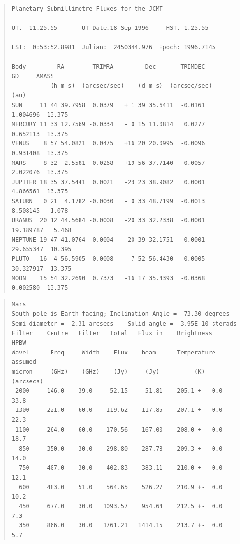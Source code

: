 \documentclass[11pt,twoside]{article}
\newenvironment{myquote}{\begin{quote}\begin{small}}{\end{small}\end{quote}}
\renewcommand{\_}{\texttt{\symbol{95}}}
\begin{document}
\begin{myquote}
\begin{verbatim}
Planetary Submillimetre Fluxes for the JCMT

UT:  11:25:55       UT Date:18-Sep-1996     HST: 1:25:55

LST:  0:53:52.8981  Julian:  2450344.976  Epoch: 1996.7145

Body         RA        TRIMRA         Dec       TRIMDEC        GD     AMASS
           (h m s)  (arcsec/sec)    (d m s)  (arcsec/sec)     (au)
SUN     11 44 39.7958  0.0379   + 1 39 35.6411  -0.0161    1.004696  13.375
MERCURY 11 33 12.7569 -0.0334   - 0 15 11.0814   0.0277    0.652113  13.375
VENUS    8 57 54.0821  0.0475   +16 20 20.0995  -0.0096    0.931408  13.375
MARS     8 32  2.5581  0.0268   +19 56 37.7140  -0.0057    2.022076  13.375
JUPITER 18 35 37.5441  0.0021   -23 23 38.9082   0.0001    4.866561  13.375
SATURN   0 21  4.1782 -0.0030   - 0 33 48.7199  -0.0013    8.508145   1.078
URANUS  20 12 44.5684 -0.0008   -20 33 32.2338  -0.0001   19.189787   5.468
NEPTUNE 19 47 41.0764 -0.0004   -20 39 32.1751  -0.0001   29.655347  10.395
PLUTO   16  4 56.5905  0.0008   - 7 52 56.4430  -0.0005   30.327917  13.375
MOON    15 54 32.2690  0.7373   -16 17 35.4393  -0.0368    0.002580  13.375
\end{verbatim}
\end{myquote}

\newpage

\begin{myquote}
\begin{verbatim}
Mars
South pole is Earth-facing; Inclination Angle =  73.30 degrees
Semi-diameter =  2.31 arcsecs    Solid angle =  3.95E-10 sterads
Filter    Centre   Filter   Total   Flux in    Brightness          HPBW
Wavel.     Freq     Width    Flux    beam      Temperature       assumed
micron     (GHz)    (GHz)    (Jy)     (Jy)          (K)          (arcsecs)
 2000     146.0    39.0     52.15     51.81    205.1 +-  0.0       33.8
 1300     221.0    60.0    119.62    117.85    207.1 +-  0.0       22.3
 1100     264.0    60.0    170.56    167.00    208.0 +-  0.0       18.7
  850     350.0    30.0    298.80    287.78    209.3 +-  0.0       14.0
  750     407.0    30.0    402.83    383.11    210.0 +-  0.0       12.1
  600     483.0    51.0    564.65    526.27    210.9 +-  0.0       10.2
  450     677.0    30.0   1093.57    954.64    212.5 +-  0.0        7.3
  350     866.0    30.0   1761.21   1414.15    213.7 +-  0.0        5.7
\end{verbatim}
\end{myquote}
\end{document}
